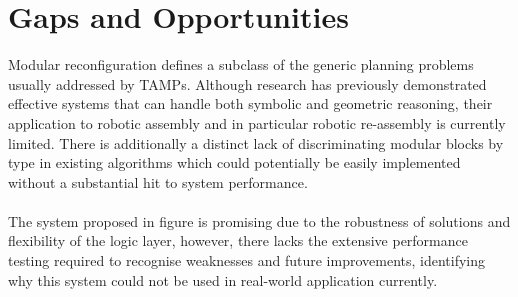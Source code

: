 \section{Gaps and Opportunities}
Modular reconfiguration defines a subclass of the generic planning problems usually addressed by TAMPs. Although research has previously demonstrated effective systems that can handle both symbolic and geometric reasoning, their application to robotic assembly and in particular robotic re-assembly is currently limited. There is additionally a distinct lack of discriminating modular blocks by type in existing algorithms which could potentially be easily implemented without a substantial hit to system performance.
\\\\
The system proposed in figure \cite{9438257} is promising due to the robustness of solutions and flexibility of the logic layer, however, there lacks the extensive performance testing required to recognise weaknesses and future improvements, identifying why this system could not be used in real-world application currently.
